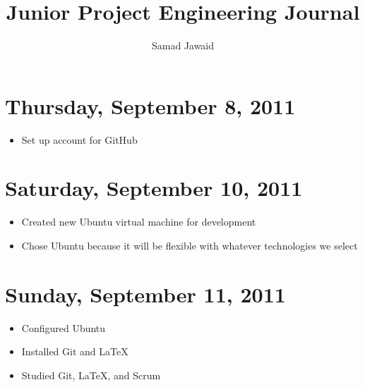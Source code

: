 \documentclass{article}
\title{Junior Project Engineering Journal}
\author{Samad Jawaid}
\begin{document}
\maketitle
\section{Thursday, September 8, 2011}
\begin{itemize}
\item Set up account for GitHub
\end{itemize}
\section{Saturday, September 10, 2011}
\begin{itemize}
\item Created new Ubuntu virtual machine for development
\item Chose Ubuntu because it will be flexible with whatever technologies we select
\end{itemize}
\section{Sunday, September 11, 2011}
\begin{itemize}
\item Configured Ubuntu
\item Installed Git and \LaTeX
\item Studied Git, \LaTeX, and Scrum
\end{itemize}
\end{document}
